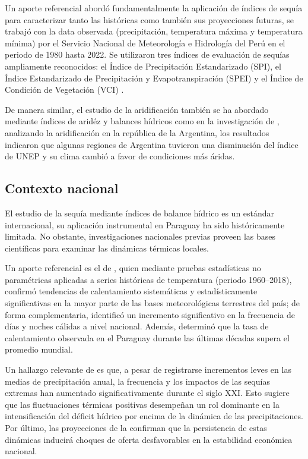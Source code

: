 Un aporte referencial abordó fundamentalmente la aplicación de índices de sequía para caracterizar tanto las históricas como también sus proyecciones futuras, se trabajó con la data observada (precipitación, temperatura máxima y temperatura mínima) por el Servicio Nacional de Meteorología e Hidrología del Perú en el periodo de 1980 hasta 2022. Se utilizaron tres índices de evaluación de sequías ampliamente reconocidos: el Índice de Precipitación Estandarizado (SPI), el Índice Estandarizado de Precipitación y Evapotranspiración (SPEI) y el Índice de Condición de Vegetación (VCI) \cite{huarahuara_silva_2024}.

De manera similar, el estudio de la aridificación también se ha abordado mediante índices de aridéz y balances hídricos como en la investigación de \cite{blanco2023}, analizando la aridificación en la república de la Argentina, los resultados indicaron que algunas regiones de Argentina tuvieron una disminución del índice de UNEP y su clima cambió a favor de condiciones más áridas.

\subsection{Contexto nacional}

El estudio de la sequía mediante índices de balance hídrico es un estándar internacional, su aplicación instrumental en Paraguay ha sido históricamente limitada. No obstante, investigaciones nacionales previas proveen las bases científicas para examinar las dinámicas térmicas locales.

Un aporte referencial es el de , quien mediante pruebas estadísticas no paramétricas aplicadas a series históricas de temperatura (periodo 1960--2018), confirmó tendencias de calentamiento sistemáticas y estadísticamente significativas en la mayor parte de las bases meteorológicas terrestres del país; de forma complementaria,  identificó un incremento significativo en la frecuencia de días y noches cálidas a nivel nacional. Además,  determinó que la tasa de calentamiento observada en el Paraguay durante las últimas décadas supera el promedio mundial. 

Un hallazgo relevante de  es que, a pesar de registrarse incrementos leves en las medias de precipitación anual, la frecuencia y los impactos de las sequías extremas han aumentado significativamente durante el siglo XXI. Esto sugiere que las fluctuaciones térmicas positivas desempeñan un rol dominante en la intensificación del déficit hídrico por encima de la dinámica de las precipitaciones. Por último, las proyecciones de la  confirman que la persistencia de estas dinámicas inducirá choques de oferta desfavorables en la estabilidad económica nacional.

